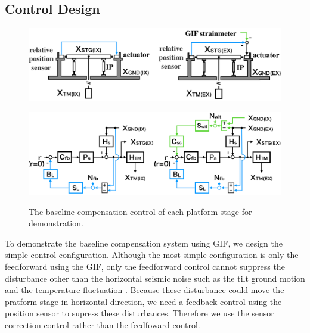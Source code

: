 \subsection{Control Design}
\begin{figure}[h]
  \begin{minipage}{14cm}
    \begin{center}   
      \includegraphics[width=14cm]{./img_chap6/img630a.png}
      \label{img:img630a} \hfill\vspace{10pt}
    \end{center}
  \end{minipage}
  \begin{minipage}{14cm}
    \begin{center}   
      \includegraphics[width=14cm]{./img_chap6/img630b.png}
      \label{img:img630b}
    \end{center}
  \end{minipage}
  \caption{The baseline compensation control of each platform stage for demonstration.}
\end{figure}

To demonstrate the baseline compensation system using GIF, we design the simple control configuration. Although the most simple configuration is only the feedforward using the GIF, only the feedforward control cannot suppress the disturbance other than the horizontal seismic noise such as the tilt ground motion and the temperature fluctuation \cite{sekiguchi2016astudy}. Because these disturbance could move the pratform stage in horizontal direction, we need a feedback control using the position sensor to supress these disturbances. Therefore we use the sensor correction control rather than the feedfoward control.

